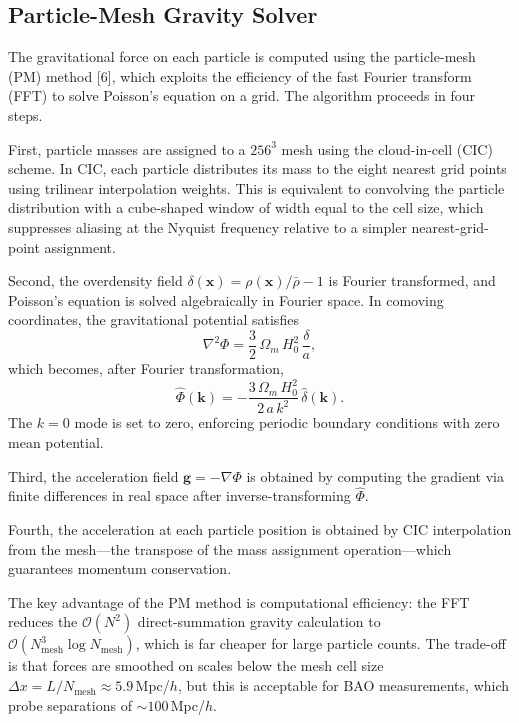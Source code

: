 \documentclass[10pt]{article}
\begin{document}
\subsection{Particle-Mesh Gravity Solver}

The gravitational force on each particle is computed using the particle-mesh (PM) method [6], which exploits the efficiency of the fast Fourier transform (FFT) to solve Poisson's equation on a grid.  The algorithm proceeds in four steps.

First, particle masses are assigned to a $256^3$ mesh using the cloud-in-cell (CIC) scheme.  In CIC, each particle distributes its mass to the eight nearest grid points using trilinear interpolation weights.  This is equivalent to convolving the particle distribution with a cube-shaped window of width equal to the cell size, which suppresses aliasing at the Nyquist frequency relative to a simpler nearest-grid-point assignment.

Second, the overdensity field $\delta(\mathbf{x}) = \rho(\mathbf{x})/\bar{\rho} - 1$ is Fourier transformed, and Poisson's equation is solved algebraically in Fourier space.  In comoving coordinates, the gravitational potential satisfies
\begin{equation}
  \nabla^2 \Phi = \frac{3}{2}\,\Omega_m\,H_0^2\,\frac{\delta}{a},
\end{equation}
which becomes, after Fourier transformation,
\begin{equation}
  \hat{\Phi}(\mathbf{k}) = -\frac{3\,\Omega_m\,H_0^2}{2\,a\,k^2}\,\hat{\delta}(\mathbf{k}).
\end{equation}
The $k = 0$ mode is set to zero, enforcing periodic boundary conditions with zero mean potential.

Third, the acceleration field $\mathbf{g} = -\nabla\Phi$ is obtained by computing the gradient via finite differences in real space after inverse-transforming $\hat{\Phi}$.

Fourth, the acceleration at each particle position is obtained by CIC interpolation from the mesh---the transpose of the mass assignment operation---which guarantees momentum conservation.

The key advantage of the PM method is computational efficiency: the FFT reduces the $\mathcal{O}(N^2)$ direct-summation gravity calculation to $\mathcal{O}(N_{\mathrm{mesh}}^3 \log N_{\mathrm{mesh}})$, which is far cheaper for large particle counts.  The trade-off is that forces are smoothed on scales below the mesh cell size $\Delta x = L/N_{\mathrm{mesh}} \approx 5.9$\,Mpc/$h$, but this is acceptable for BAO measurements, which probe separations of $\sim 100$\,Mpc/$h$.
\end{document}
